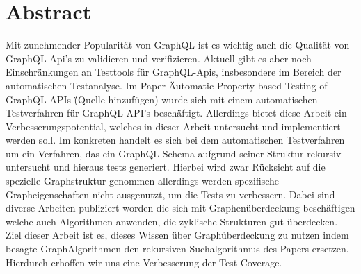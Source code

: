\chapter{Abstract}

Mit zunehmender Popularität von GraphQL ist es wichtig auch die Qualität von GraphQL-Api's zu validieren und verifizieren.
Aktuell gibt es aber noch Einschränkungen an Testtools für GraphQL-Apis, insbesondere im Bereich der automatischen Testanalyse.
Im Paper \" Automatic Property-based Testing of GraphQL APIs \" (Quelle hinzufügen) wurde sich mit einem automatischen
Testverfahren für GraphQL-API's beschäftigt.
Allerdings bietet diese Arbeit ein Verbesserungspotential, welches in dieser Arbeit untersucht und implementiert werden soll.
Im konkreten handelt es sich bei dem automatischen Testverfahren um ein Verfahren, das ein GraphQL-Schema aufgrund seiner
Struktur rekursiv untersucht und hieraus tests generiert.
Hierbei wird zwar Rücksicht auf die spezielle Graphstruktur genommen allerdings werden spezifische Grapheigenschaften nicht ausgenutzt, um die Tests zu verbessern.
Dabei sind diverse Arbeiten publiziert worden die sich mit Graphenüberdeckung beschäftigen welche auch
Algorithmen anwenden, die zyklische Strukturen gut überdecken.
Ziel dieser Arbeit ist es, dieses Wissen über Graphüberdeckung zu nutzen indem besagte GraphAlgorithmen
den rekursiven Suchalgorithmus des Papers ersetzen.
Hierdurch erhoffen wir uns eine Verbesserung der Test-Coverage.